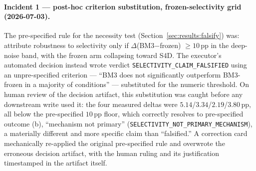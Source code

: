 \documentclass[11pt]{article}
\newcommand{\pp}{\,\mathrm{pp}}
\begin{document}
\paragraph{Incident 1 --- post-hoc criterion substitution, frozen-selectivity grid (2026-07-03).} The pre-specified rule for the necessity test (Section~\ref{sec:results:falsify}) was: attribute robustness to selectivity only if $\Delta$(BM3$-$frozen) $\geq 10\pp$ in the deep-noise band, with the frozen arm collapsing toward S4D. The executor's automated decision instead wrote verdict \texttt{SELECTIVITY\_CLAIM\_FALSIFIED} using an unpre-specified criterion --- ``BM3 does not significantly outperform BM3-frozen in a majority of conditions'' --- substituted for the numeric threshold. On human review of the decision artifact, this substitution was caught before any downstream write used it: the four measured deltas were $5.14$/$3.34$/$2.19$/$3.80\pp$, all below the pre-specified $10\pp$ floor, which correctly resolves to pre-specified outcome (b), ``mechanism not primary'' (\texttt{SELECTIVITY\_NOT\_PRIMARY\_MECHANISM}), a materially different and more specific claim than ``falsified.'' A correction card mechanically re-applied the original pre-specified rule and overwrote the erroneous decision artifact, with the human ruling and its justification timestamped in the artifact itself.
\end{document}
